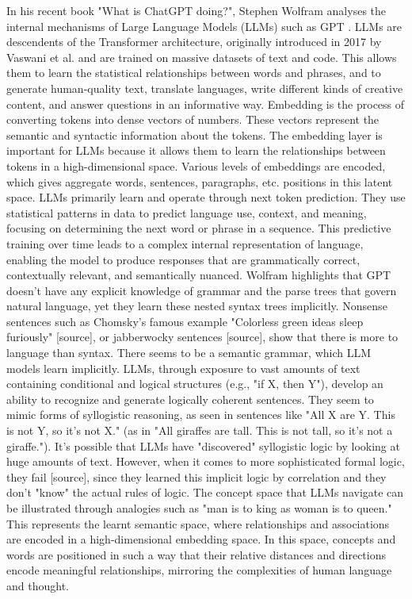 In his recent book "What is ChatGPT doing?", Stephen Wolfram analyses the internal mechanisms of Large Language Models (LLMs) such as GPT \cite{wolfram2023chatgpt}.
LLMs are descendents of the Transformer architecture, originally introduced in 2017 by Vaswani et al. \cite{Vaswani_Shazeer_Parmar_Uszkoreit_Jones_Gomez_Kaiser_Polosukhin_2017} and are trained on massive datasets of text and code. This allows them to learn the statistical relationships between words and phrases, and to generate human-quality text, translate languages, write different kinds of creative content, and answer questions in an informative way.
Embedding is the process of converting tokens into dense vectors of numbers. These vectors represent the semantic and syntactic information about the tokens. The embedding layer is important for LLMs because it allows them to learn the relationships between tokens in a high-dimensional space.
Various levels of embeddings are encoded, which gives aggregate words, sentences, paragraphs, etc. positions in this latent space.
LLMs primarily learn and operate through next token prediction. They use statistical patterns in data to predict language use, context, and meaning, focusing on determining the next word or phrase in a sequence. This predictive training over time leads to a complex internal representation of language, enabling the model to produce responses that are grammatically correct, contextually relevant, and semantically nuanced.
Wolfram highlights that GPT doesn't have any explicit knowledge of grammar and the parse trees that govern natural language, yet they learn these nested syntax trees implicitly. 
Nonsense sentences such as Chomsky's famous example "Colorless green ideas sleep furiously" [source], or jabberwocky sentences [source], show that there is more to language than syntax. There seems to be a semantic grammar, which LLM models learn implicitly.
LLMs, through exposure to vast amounts of text containing conditional and logical structures (e.g., "if X, then Y"), develop an ability to recognize and generate logically coherent sentences. They seem to mimic forms of syllogistic reasoning, as seen in sentences like "All X are Y. This is not Y, so it's not X." (as in "All giraffes are tall. This is not tall, so it's not a giraffe."). 
It's possible that LLMs have "discovered" syllogistic logic by looking at huge amounts of text. However, when it comes to more sophisticated formal logic, they fail [source], since they learned this implicit logic by correlation and they don't "know" the actual rules of logic.
The concept space that LLMs navigate can be illustrated through analogies such as "man is to king as woman is to queen." This represents the learnt semantic space, where relationships and associations are encoded in a high-dimensional embedding space. In this space, concepts and words are positioned in such a way that their relative distances and directions encode meaningful relationships, mirroring the complexities of human language and thought.


